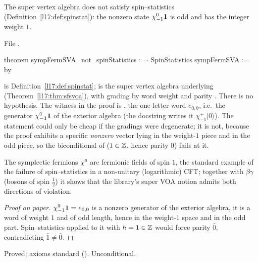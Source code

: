 \begin{theorem}\label{l17:thm:sfspin}
The super vertex algebra  does not satisfy spin--statistics
(Definition~\ref{l17:def:spinstat}): the nonzero state $\chi^0_{-1}\mathbf{1}$ is odd and has the integer weight $1$.
\end{theorem}
\noindent File .
\begin{leancode}
theorem sympFermSVA_not_spinStatistics : ¬ SpinStatistics sympFermSVA := by
\end{leancode}
\begin{dictionary}
 is Definition~\ref{l17:def:spinstat};  is the super vertex algebra underlying
 (Theorem~\ref{l17:thm:sfsvoa}), with grading by word weight and parity . There is no
hypothesis. The witness in the proof is , the one-letter word $e_{0,0}$, i.e.\ the generator
$\chi^0_{-1}\mathbf{1}$ of the exterior algebra (the docstring writes it $\chi^+_{-1}|0\rangle$). The statement could only be
cheap if the gradings were degenerate; it is not, because the proof exhibits a specific \emph{nonzero} vector lying in the weight-$1$
piece and in the odd piece, so the biconditional of  ($1\in{\mathbb{Z}}$, hence parity $0$) fails at it.
\end{dictionary}
\begin{physics}
The symplectic fermions $\chi^a$ are fermionic fields of spin $1$, the standard example of the failure of spin--statistics in a
non-unitary (logarithmic) CFT; together with $\beta\gamma$ (bosons of spin $\frac12$) it shows that the library's super VOA
notion admits both directions of violation.
\end{physics}
\begin{proof}[Proof on paper]
$\chi^0_{-1}\mathbf{1}=e_{0,0}$ is a nonzero generator of the exterior algebra, it is a word of weight $1$ and of odd length,
hence in the weight-$1$ space and in the odd part. Spin--statistics applied to it with $h=1\in{\mathbb{Z}}$ would force parity $\bar0$,
contradicting $\bar1\neq\bar0$.
\end{proof}
\begin{status}
Proved; axioms standard (). Unconditional.
\end{status}

